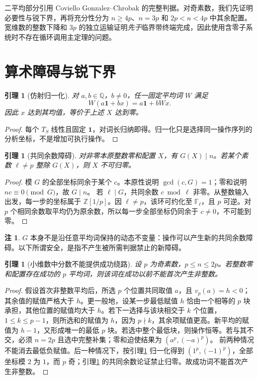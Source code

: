 \documentclass[11pt,a4paper]{article}
\newcommand{\QQ}{\mathbb Q}
\newcommand{\ZZ}{\mathbb Z}
\newcommand{\FF}{\mathbb F}
\newtheorem{lemma}[theorem]{引理}
\theoremstyle{definition}
\newtheorem{remark}[theorem]{注}
\numberwithin{equation}{section}
\begin{document}
二平均部分引用 Coviello Gonzalez--Chrobak 的完整判据\cite{mixing}。对奇素数，我们先证明必要性与锐下界，再将充分性分为 $n\ge4p$、$n=3p$ 和 $2p<n<4p$ 中其余配置。宽维数的整数下降和 $3p$ 的独立运输证明\emph{先于}临界带终端完成，因此使用含零子系统时不存在循环调用主定理的问题。

\section{算术障碍与锐下界}\label{sec:obstruction}
\begin{lemma}[仿射归一化]\label{lem:normalize}
对 $a,b\in\QQ$，$b\ne0$，任一固定平均词 $W$ 满足
\[W(a\mathbf1+bx)=a\mathbf1+bWx.\]
因此 $x$ 达到其均值，等价于上述 $X$ 达到零。
\end{lemma}
\begin{proof}
每个 $T_S$ 线性且固定 $\mathbf1$，对词长归纳即得。归一化只是选择同一操作序列的分析坐标，不是增加可执行操作。
\end{proof}

\begin{lemma}[共同余数障碍]\label{lem:G}
对非零本原整数零和配置 $X$，有 $G(X)\mid n$。若某个素数 $\ell\ne p$ 整除 $G(X)$，则 $X$ 不可归零。
\end{lemma}
\begin{proof}
模 $G$ 的全部坐标同余于某个 $c$。本原性说明 $\gcd(c,G)=1$；零和说明 $nc\equiv0\pmod G$，故 $G\mid n$。
若 $\ell\mid G$，共同余数 $c\bmod\ell$ 非零。从整数输入出发，每一步的坐标属于 $\ZZ[1/p]$。因 $\ell\ne p$，该环可约化至 $\FF_\ell$，且 $p$ 可逆。对 $p$ 个相同余数取平均仍为原余数，所以每一步全部坐标仍同余于 $c\ne0$，不可能到零。
\end{proof}

\begin{remark}
$G$ 本身不是沿任意平均词保持的动态不变量：操作可以产生新的共同余数障碍。以下所谓安全，是指不产生被所需判据禁止的新障碍。
\end{remark}

\begin{lemma}[小维数中分数不能提供成功绕路]\label{lem:no-fraction}
设 $p$ 为奇素数，$p\le n\le2p$。若整数零和配置存在成功的 $p$ 平均词，则该词在成功以前不能首次产生非整数。
\end{lemma}
\begin{proof}
假设首次非整数平均后，所选 $p$ 个位置共同取值 $a$，且 $v_p(a)=h<0$；其余值的赋值严格大于 $h$。更一般地，设某一步最低赋值 $h$ 恰由一个相等的 $p$ 块承担，其他位置的赋值均大于 $h$。若下一选择与该块相交于 $k$ 个位置，$1\le k\le p-1$，则所选和的赋值为 $h$，因为 $p\nmid k$，其余项赋值更高。新平均的赋值为 $h-1$，又形成唯一的最低 $p$ 块。若选中整个最低块，则操作恒等。若与其不交，必须 $n=2p$ 且选中完整补集；零和迫使结果为 $(a^p,(-a)^p)$。
前两种情况不能消去最低负赋值。后一种情况下，按引理\ref{lem:normalize} 归一化得到 $(1^p,(-1)^p)$，全部坐标模 $2$ 为 $1$，而 $p$ 奇；引理\ref{lem:G} 的共同余数论证禁止归零。故成功词不能首次产生非整数。
\end{proof}
\end{document}
